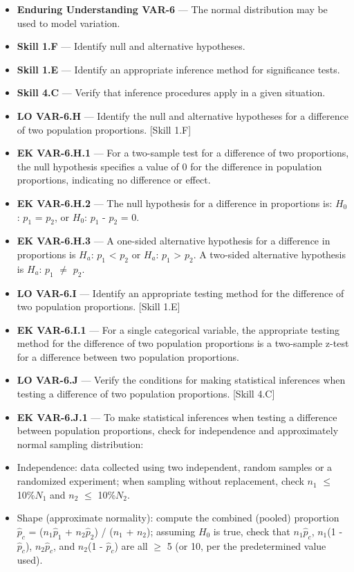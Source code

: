 \documentclass[11pt]{article}
\begin{document}


{\small
\begin{itemize}[leftmargin=1.5em,itemsep=2pt,topsep=2pt]
  \item \textbf{Enduring Understanding VAR-6} --- The normal distribution may be used to model variation.
  \item \textbf{Skill 1.F} --- Identify null and alternative hypotheses.
  \item \textbf{Skill 1.E} --- Identify an appropriate inference method for significance tests.
  \item \textbf{Skill 4.C} --- Verify that inference procedures apply in a given situation.
  \item \textbf{LO VAR-6.H} --- Identify the null and alternative hypotheses for a difference of two population proportions. [Skill 1.F]
  \item \textbf{EK VAR-6.H.1} --- For a two-sample test for a difference of two proportions, the null hypothesis specifies a value of 0 for the difference in population proportions, indicating no difference or effect.
  \item \textbf{EK VAR-6.H.2} --- The null hypothesis for a difference in proportions is: $H_0$: $p_1$ = $p_2$, or $H_0$: $p_1$ - $p_2$ = 0.
  \item \textbf{EK VAR-6.H.3} --- A one-sided alternative hypothesis for a difference in proportions is $H_a$: $p_1$ < $p_2$ or $H_a$: $p_1$ > $p_2$. A two-sided alternative hypothesis is $H_a$: $p_1$ $\neq$ $p_2$.
  \item \textbf{LO VAR-6.I} --- Identify an appropriate testing method for the difference of two population proportions. [Skill 1.E]
  \item \textbf{EK VAR-6.I.1} --- For a single categorical variable, the appropriate testing method for the difference of two population proportions is a two-sample z-test for a difference between two population proportions.
  \item \textbf{LO VAR-6.J} --- Verify the conditions for making statistical inferences when testing a difference of two population proportions. [Skill 4.C]
  \item \textbf{EK VAR-6.J.1} --- To make statistical inferences when testing a difference between population proportions, check for independence and approximately normal sampling distribution:
  \item Independence: data collected using two independent, random samples or a randomized experiment; when sampling without replacement, check $n_1$ $\leq$ 10\%$N_1$ and $n_2$ $\leq$ 10\%$N_2$.
  \item Shape (approximate normality): compute the combined (pooled) proportion $\widehat p_c$ = ($n_1$$\widehat p_1$ + $n_2$$\widehat p_2$) / ($n_1$ + $n_2$); assuming $H_0$ is true, check that $n_1$$\widehat p_c$, $n_1$(1 - $\widehat p_c$), $n_2$$\widehat p_c$, and $n_2$(1 - $\widehat p_c$) are all $\geq$ 5 (or 10, per the predetermined value used).
\end{itemize}
}
\end{document}
